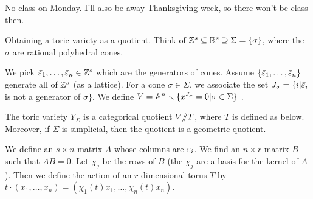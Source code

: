 
No class on Monday. I'll also be away Thanksgiving week, so there won't be class then.

Obtaining a toric variety as a quotient. Think of $\ZZ^s\subseteq \RR^s\supseteq \Sigma=\{\sigma\}$, where the $\sigma$ are rational polyhedral cones.

We pick $\bar\e_1,\dots, \bar\e_n\in \ZZ^s$ which are the generators of cones. Assume $\{\bar\e_1,\dots,\bar\e_n\}$ generate all of $\ZZ^s$ (as a lattice). For a cone $\sigma\in\Sigma$, we associate the set $J_\sigma=\{i|\bar\e_i$ is not a generator of $\sigma\}$. We define $V=\AA^n\setminus \{x^{J_\sigma}=0|\sigma\in \Sigma\}$ .

\begin{claim}
 The toric variety $Y_\Sigma$ is a categorical quotient $V\quot T$, where $T$ is defined as below. Moreover, if $\Sigma$ is simplicial, then the quotient is a geometric quotient.
\end{claim}
We define an $s\times n$ matrix $A$ whose columns are $\bar\e_i$. We find an $n\times r$ matrix $B$ such that $AB=0$. Let $\chi_j$ be the rows of $B$ (the $\chi_j$ are a basis for the kernel of $A$). Then we define the action of an $r$-dimensional torus $T$ by $t\cdot (x_1,\dots, x_n)=(\chi_1(t)x_1,\dots, \chi_n(t)x_n)$.

